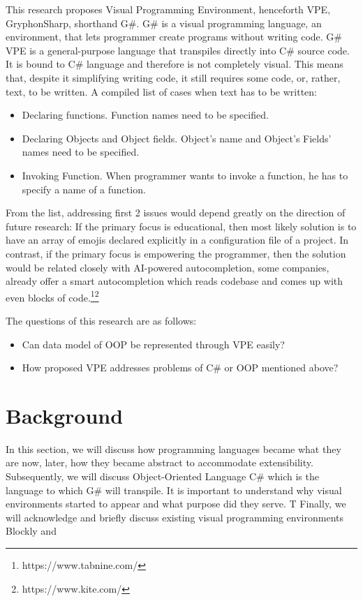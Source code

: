 \documentclass{article}
\begin{document}
This research proposes Visual Programming Environment, henceforth VPE, GryphonSharp, shorthand G\#. G\# is a visual programming language, an environment, that lets programmer create programs without writing code. G\# VPE is a general-purpose language that transpiles directly into C\# source code. It is bound to C\# language and therefore is not completely visual. This means that, despite it simplifying writing code, it still requires some code, or, rather, text, to be written. A compiled list of cases when text has to be written:
\begin{itemize}
    \item Declaring functions.\newline
    Function names need to be specified.
    \item Declaring Objects and Object fields.\newline
    Object's name and Object's Fields' names need to be specified.
    \item Invoking Function.\newline
    When programmer wants to invoke a function, he has to specify a name of a function.
\end{itemize}
From the list, addressing first 2 issues would depend greatly on the direction of future research: 
If the primary focus is educational, then most likely solution is to have an array of emojis declared explicitly in a configuration file of a project.
In contrast, if the primary focus is empowering the programmer, then the solution would be related closely with AI-powered autocompletion, some companies, already offer a smart autocompletion which reads codebase and comes up with even blocks of code.\footnote{https://www.tabnine.com/}\footnote{https://www.kite.com/}

The questions of this research are as follows:
\begin{itemize}
    \item Can data model of OOP be represented through VPE easily?
    \item How proposed VPE addresses problems of C\# or OOP mentioned above?
\end{itemize}




\section{Background}
In this section, we will discuss how programming languages became what they are now, later, how they became abstract to accommodate extensibility.
Subsequently, we will discuss Object-Oriented Language C\# which is the language to which G\# will transpile.
It is important to understand why visual environments started to appear and what purpose did they serve. T
Finally, we will acknowledge and briefly discuss existing visual programming environments Blockly and 
\end{document}
